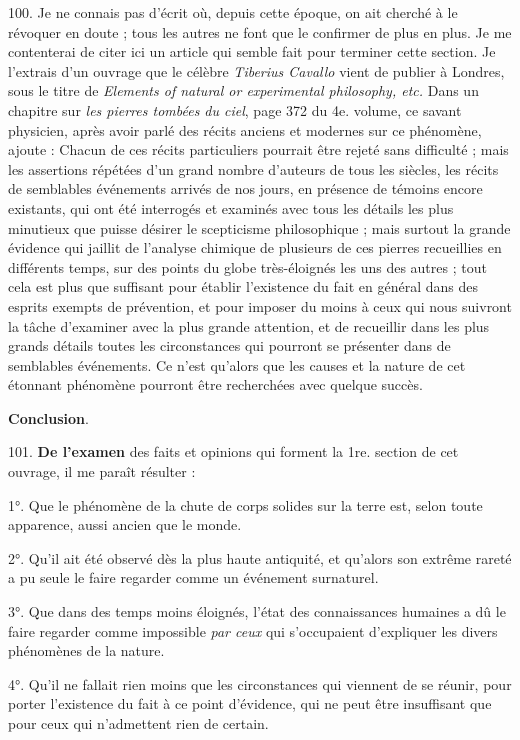\documentclass[a4paper, 11pt, oneside, polutonikogreek, french]{article}
\begin{document}
100. Je ne connais pas d'écrit où, depuis cette époque, on ait cherché à le révoquer en doute ; tous les autres ne font que le confirmer de plus en plus. Je me contenterai de citer ici un article qui semble fait pour terminer cette section. Je l'extrais d'un ouvrage que le célèbre \emph{Tiberius Cavallo} vient de publier à Londres, sous le titre de \emph{Elements of natural or experimental philosophy, etc.} Dans un chapitre sur \emph{les pierres tombées du ciel}, page 372 du 4e. volume, ce savant physicien, après avoir parlé des récits anciens et modernes sur ce phénomène, ajoute : \og Chacun de ces récits particuliers pourrait être rejeté sans difficulté ; mais les assertions répétées d'un grand nombre d'auteurs de tous les siècles, les récits de semblables événements arrivés de nos jours, en présence de témoins encore existants, qui ont été interrogés et examinés avec tous les détails les plus minutieux que puisse désirer le scepticisme philosophique ; mais surtout la grande évidence qui jaillit de l'analyse chimique de plusieurs de ces pierres recueillies en différents temps, sur des points du globe très-éloignés les uns des autres ; tout cela est plus que suffisant pour établir l'existence du fait en général dans des esprits exempts de prévention, et pour imposer du moins à ceux qui nous suivront la tâche d'examiner avec la plus grande attention, et de recueillir dans les plus grands détails toutes les circonstances qui pourront se présenter dans de semblables événements. Ce n'est qu'alors que les causes et la nature de cet étonnant phénomène pourront être recherchées avec quelque succès. \fg

\textbf{Conclusion}.

101. \textbf{De l'examen} des faits et opinions qui forment la 1re. section de cet ouvrage, il me paraît résulter :

1°. Que le phénomène de la chute de corps solides sur la terre est, selon toute apparence, aussi ancien que le monde.

2°. Qu'il ait été observé dès la plus haute antiquité, et qu'alors son extrême rareté a pu seule le faire regarder comme un événement surnaturel.

3°. Que dans des temps moins éloignés, l'état des connaissances humaines a dû le faire regarder comme impossible \emph{par ceux} qui s'occupaient d'expliquer les divers phénomènes de la nature.

4°. Qu'il ne fallait rien moins que les circonstances qui viennent de se réunir, pour porter l'existence du fait à ce point d'évidence, qui ne peut être insuffisant que pour ceux qui n'admettent rien de certain.
\end{document}
